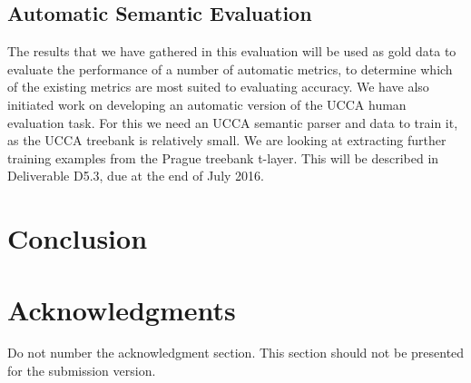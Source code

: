 \documentclass[11pt]{article}
\begin{document}
%
%


\subsection{Automatic Semantic Evaluation}

The results that we have gathered in this evaluation will be used as gold data to evaluate the performance of a number of automatic
metrics, to determine which of the existing metrics are most suited to evaluating accuracy.  We have also  initiated
work on developing an automatic version of the UCCA human evaluation task. For this we need an UCCA semantic parser
and data to train it, as the UCCA treebank is relatively small. We are looking at extracting further training examples from
the Prague treebank t-layer. This will be described in Deliverable D5.3, due at the end of July 2016. 


\section{Conclusion}

\section*{Acknowledgments}

Do not number the acknowledgment section.
This section should not be presented for the submission version.



\end{document}
